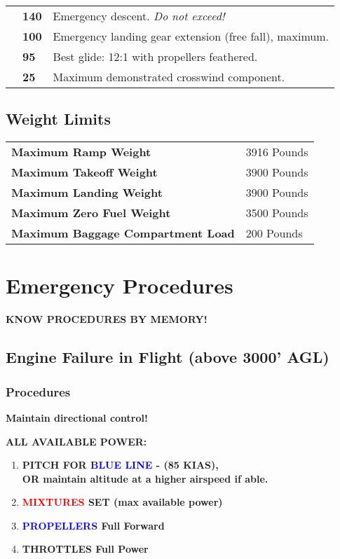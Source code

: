 \begin{table}[h]
\begin{tabular}{lll}
\textbf{}                               & \textbf{140}     & Emergency descent. \emph{Do not exceed!}                         \\
\textbf{}                               & \textbf{100}     & Emergency landing gear extension (free fall), maximum.           \\
\textbf{}                               & \textbf{95}      & Best glide: 12:1 with propellers feathered.                      \\
\textbf{}                               & \textbf{25}      & Maximum demonstrated crosswind component.
\end{tabular}
\end{table}

\section{Weight Limits}

\begin{table}[h]
\centering
\begin{tabular}{ll}
\textbf{Maximum Ramp Weight}              & 3916 Pounds \\
\textbf{Maximum Takeoff Weight}           & 3900 Pounds \\
\textbf{Maximum Landing Weight}           & 3900 Pounds \\
\textbf{Maximum Zero Fuel Weight}         & 3500 Pounds \\
\textbf{Maximum Baggage Compartment Load} & 200 Pounds 
\end{tabular}
\end{table}

\chapter{Emergency Procedures}

\textbf{KNOW PROCEDURES BY MEMORY!}

\section{Engine Failure in Flight (above 3000' AGL)}

\subsection{Procedures}

\textbf{Maintain directional control!}

\textbf{ALL AVAILABLE POWER:}
\begin{enumerate}
    \item \textbf{PITCH FOR \textcolor{blue}{BLUE LINE} - \vyse (85 KIAS),\\OR maintain altitude at a higher airspeed if able.}
    \item \textbf{\textcolor{red}{MIXTURES} SET (max available power)}
    \item \textbf{\textcolor{blue}{PROPELLERS} Full Forward}
    \item \textbf{THROTTLES Full Power}
\end{enumerate}


